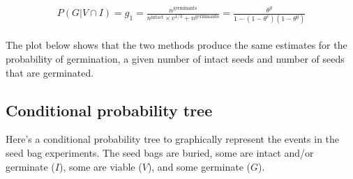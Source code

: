 \documentclass[12pt, oneside]{article}   	%
\begin{document}
    \begin{align}
\begin{split}
P(G | V \cap I)  = g_1 = \frac{n^{\mathrm{germinants}}}{n^{\mathrm{intact}}\times v^{1/3} + n^{\mathrm{germinants}}} = \frac{ \theta^g }{ 1-(1-\theta^v)(1-\theta^g)}
  \end{split}
\end{align}

The plot below shows that the two methods produce the same estimates for the probability of germination, a given number of intact seeds and number of seeds that are germinated.  

\subsection*{Conditional probability tree}

Here's a conditional probability tree to graphically represent the events in the seed bag experiments. The seed bags are buried, some are intact and/or germinate ($I$), some are viable ($V$), and some germinate ($G$). 
\end{document}
